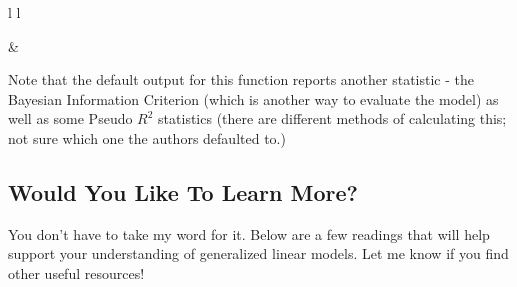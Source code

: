 \documentclass[
  letterpaper,
  DIV=11,
  numbers=noendperiod,
  oneside]{scrreprt}
\begin{document}
\begin{table}[ht]
\begin{centerbox}
\begin{threeparttable}
\begin{tabular}{l l}
\hhline{}

 &
 \tabularnewline[-0.5pt]



 \tabularnewline[-0.5pt]


\hhline{}
\end{tabular}
\end{threeparttable}\par\end{centerbox}

\end{table}
 

Note that the default output for this function reports another statistic
- the Bayesian Information Criterion (which is another way to evaluate
the model) as well as some Pseudo \(R^2\) statistics (there are
different methods of calculating this; not sure which one the authors
defaulted to.)

\subsection{Would You Like To Learn
More?}\label{would-you-like-to-learn-more}

You don't have to take my word for it. Below are a few readings that
will help support your understanding of generalized linear models. Let
me know if you find other useful resources!
\end{document}
